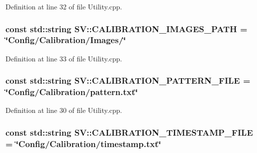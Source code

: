 Definition at line 32 of file Utility.\-cpp.

\hypertarget{namespace_s_v_aca9f280a6ae4110ddbfcb3db20c40931}{
\subsubsection[{C\-A\-L\-I\-B\-R\-A\-T\-I\-O\-N\-\_\-\-I\-M\-A\-G\-E\-S\-\_\-\-P\-A\-T\-H}]{\setlength{\rightskip}{0pt plus 5cm}const std\-::string S\-V\-::\-C\-A\-L\-I\-B\-R\-A\-T\-I\-O\-N\-\_\-\-I\-M\-A\-G\-E\-S\-\_\-\-P\-A\-T\-H = \char`\"{}Config/Calibration/Images/\char`\"{}}}\label{namespace_s_v_aca9f280a6ae4110ddbfcb3db20c40931}


Definition at line 33 of file Utility.\-cpp.

\hypertarget{namespace_s_v_ab14088c3b114b4905a5064056e160576}{
\subsubsection[{C\-A\-L\-I\-B\-R\-A\-T\-I\-O\-N\-\_\-\-P\-A\-T\-T\-E\-R\-N\-\_\-\-F\-I\-L\-E}]{\setlength{\rightskip}{0pt plus 5cm}const std\-::string S\-V\-::\-C\-A\-L\-I\-B\-R\-A\-T\-I\-O\-N\-\_\-\-P\-A\-T\-T\-E\-R\-N\-\_\-\-F\-I\-L\-E = \char`\"{}Config/Calibration/pattern.\-txt\char`\"{}}}\label{namespace_s_v_ab14088c3b114b4905a5064056e160576}


Definition at line 30 of file Utility.\-cpp.

\hypertarget{namespace_s_v_a25683376004000d485cf2c87db0f6b2a}{
\subsubsection[{C\-A\-L\-I\-B\-R\-A\-T\-I\-O\-N\-\_\-\-T\-I\-M\-E\-S\-T\-A\-M\-P\-\_\-\-F\-I\-L\-E}]{\setlength{\rightskip}{0pt plus 5cm}const std\-::string S\-V\-::\-C\-A\-L\-I\-B\-R\-A\-T\-I\-O\-N\-\_\-\-T\-I\-M\-E\-S\-T\-A\-M\-P\-\_\-\-F\-I\-L\-E = \char`\"{}Config/Calibration/timestamp.\-txt\char`\"{}}}\label{namespace_s_v_a25683376004000d485cf2c87db0f6b2a}


